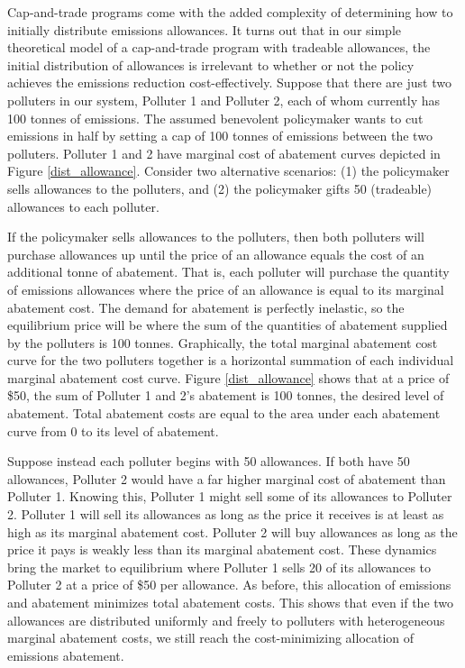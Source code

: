 Cap-and-trade programs come with the added complexity of determining how to initially distribute emissions allowances. It turns out that in our simple theoretical model of a cap-and-trade program with tradeable allowances, the initial distribution of allowances is irrelevant to whether or not the policy achieves the emissions reduction cost-effectively. Suppose that there are just two polluters in our system, Polluter 1 and Polluter 2, each of whom currently has 100 tonnes of emissions. The assumed benevolent policymaker wants to cut emissions in half by setting a cap of 100 tonnes of emissions between the two polluters. Polluter 1 and 2 have marginal cost of abatement curves depicted in Figure \ref{dist_allowance}. Consider two alternative scenarios: (1) the policymaker sells allowances to the polluters, and (2) the policymaker gifts 50 (tradeable) allowances to each polluter. 

If the policymaker sells allowances to the polluters, then both polluters will purchase allowances up until the price of an allowance equals the cost of an additional tonne of abatement. That is, each polluter will purchase the quantity of emissions allowances where the price of an allowance is equal to its marginal abatement cost. The demand for abatement is perfectly inelastic, so the equilibrium price will be where the sum of the quantities of abatement supplied by the polluters is 100 tonnes. Graphically, the total marginal abatement cost curve for the two polluters together is a horizontal summation of each individual marginal abatement cost curve. Figure \ref{dist_allowance} shows that at a price of \$50, the sum of Polluter 1 and 2's abatement is 100 tonnes, the desired level of abatement. Total abatement costs are equal to the area under each abatement curve from 0 to its level of abatement. 

Suppose instead each polluter begins with 50 allowances. If both have 50 allowances, Polluter 2 would have a far higher marginal cost of abatement than Polluter 1. Knowing this, Polluter 1 might sell some of its allowances to Polluter 2. Polluter 1 will sell its allowances as long as the price it receives is at least as high as its marginal abatement cost. Polluter 2 will buy allowances as long as the price it pays is weakly less than its marginal abatement cost. These dynamics bring the market to equilibrium where Polluter 1 sells 20 of its allowances to Polluter 2 at a price of \$50 per allowance. As before, this allocation of emissions and abatement minimizes total abatement costs. This shows that even if the two allowances are distributed uniformly and freely to polluters with heterogeneous marginal abatement costs, we still reach the cost-minimizing allocation of emissions abatement.

